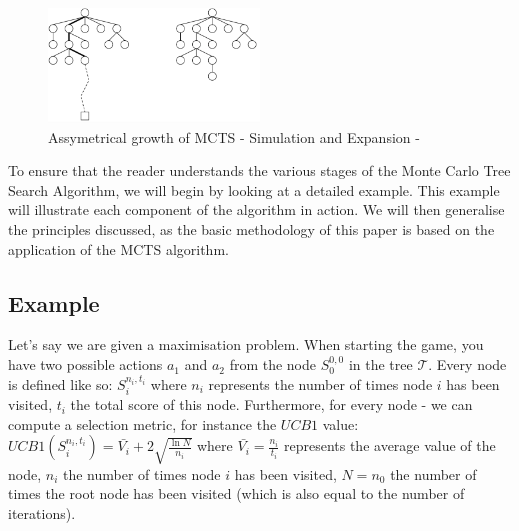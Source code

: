 \begin{figure}[!ht]
    \centering
    \includegraphics[width=0.5\textwidth]{Figures/assymetric_growth_mcts_tree.png}
    \caption{Assymetrical growth of MCTS - Simulation and Expansion - \cite{mcts_assymetrical_growth}}
    \label{fig:Assymetrical_growth_MCTS}
\end{figure}
To ensure that the reader understands the various stages of the Monte Carlo Tree Search Algorithm, we will begin by looking at a detailed example. This example will illustrate each component of the algorithm in action. We will then generalise the principles discussed, as the basic methodology of this paper is based on the application of the MCTS algorithm.


\subsection{Example}
\label{Example}
Let's say we are given a maximisation problem. When starting the game, you have two possible actions $a_1$ and $a_2$ from the node $S^{0,0}_0$ in the tree $\mathcal{T}$.
Every node is defined like so: $S^{n_i,t_i}_i$ where $n_i$ represents the number of times node $i$ has been visited, $t_i$ the total score of this node.
Furthermore, for every node - we can compute a selection metric, for instance the $UCB1$ value: $UCB1(S^{n_i,t_i}_i)=\bar{V_i} + 2 \sqrt{\frac{\ln N}{n_i}}$ where $\bar{V_i}=\frac{n_i}{t_i}$ represents the average value of the node, $n_i$ the number of times node $i$ has been visited, $N=n_0$ the number of times the root node has been visited (which is also equal to the number of iterations).

